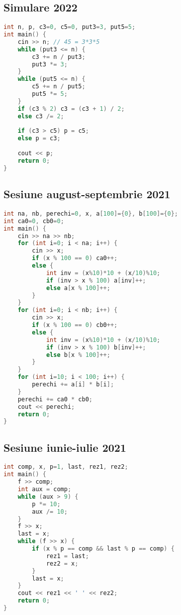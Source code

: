 \documentclass[10pt, a4paper, twocolumn]{article}
\begin{document}
\subsection*{Simulare 2022}
\begin{lstlisting}[language=C++]
int n, p, c3=0, c5=0, put3=3, put5=5;
int main() {
    cin >> n; // 45 = 3*3*5
    while (put3 <= n) {
        c3 += n / put3;
        put3 *= 3;
    }
    while (put5 <= n) {
        c5 += n / put5;
        put5 *= 5;
    }
    if (c3 % 2) c3 = (c3 + 1) / 2;
    else c3 /= 2;
    
    if (c3 > c5) p = c5;
    else p = c3;
    
    cout << p;
    return 0;
}
\end{lstlisting}
\vspace{0.5cm}

\subsection*{Sesiune august-septembrie 2021}
\begin{lstlisting}[language=C++]
int na, nb, perechi=0, x, a[100]={0}, b[100]={0};
int ca0=0, cb0=0;
int main() {
    cin >> na >> nb;
    for (int i=0; i < na; i++) {
        cin >> x;
        if (x % 100 == 0) ca0++;
        else {
            int inv = (x%10)*10 + (x/10)%10;
            if (inv > x % 100) a[inv]++;
            else a[x % 100]++;
        }
    }
    for (int i=0; i < nb; i++) {
        cin >> x;
        if (x % 100 == 0) cb0++;
        else {
            int inv = (x%10)*10 + (x/10)%10;
            if (inv > x % 100) b[inv]++;
            else b[x % 100]++;
        }
    }
    for (int i=10; i < 100; i++) {
        perechi += a[i] * b[i];
    }
    perechi += ca0 * cb0;
    cout << perechi;
    return 0;
}
\end{lstlisting}
\vspace{0.5cm}

\subsection*{Sesiune iunie-iulie 2021}
\begin{lstlisting}[language=C++]
int comp, x, p=1, last, rez1, rez2;
int main() {
    f >> comp;
    int aux = comp;
    while (aux > 9) {
        p *= 10;
        aux /= 10;
    }
    f >> x;
    last = x;
    while (f >> x) {
        if (x % p == comp && last % p == comp) {
            rez1 = last;
            rez2 = x;
        }
        last = x;
    }
    cout << rez1 << ' ' << rez2;
    return 0;
}
\end{lstlisting}
\vspace{0.5cm}
\end{document}

